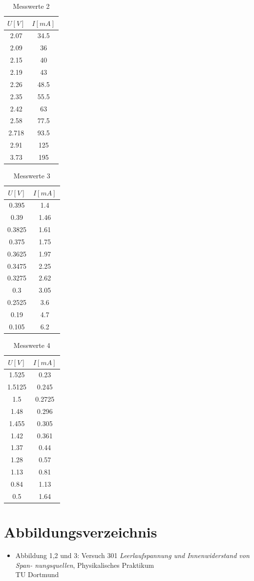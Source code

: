 \documentclass[11pt]{article}
\begin{document}
 
 \begin{table}[H]
 \centering
 \caption{Messwerte 2}
 \begin{tabular}{|c|c|}
  \hline
  $U[V]$ & $I[mA]$  \\
  \hline
  2.07 & 34.5 \\
  2.09 & 36 \\
  2.15 & 40 \\
  2.19 & 43 \\
  2.26 & 48.5\\
  2.35 & 55.5\\
  2.42 & 63 \\
  2.58 & 77.5\\
  2.718 & 93.5\\
  2.91 & 125\\
  3.73 & 195\\
  \hline
 \end{tabular}
 \label{Messung 2}
 \end{table}
 
 
 \begin{table}[H]
 \centering
 \caption{Messwerte 3}
 \begin{tabular}{|c|c|}
  \hline
  $U[V]$ & $I[mA]$  \\
  \hline
  0.395 & 1.4 \\
  0.39 & 1.46 \\
  0.3825& 1.61 \\
  0.375 & 1.75 \\
  0.3625 & 1.97\\
  0.3475 & 2.25\\
  0.3275 & 2.62 \\
  0.3 & 3.05\\
  0.2525 & 3.6\\
  0.19 & 4.7\\
  0.105 & 6.2\\
  \hline
 \end{tabular}
 \label{Messung 3}
 \end{table}
 
 
 \begin{table}[H]
 \centering
 \caption{Messwerte 4}
 \begin{tabular}{|c|c|}
  \hline
  $U[V]$ & $I[mA]$  \\
  \hline
  1.525 & 0.23 \\
  1.5125 & 0.245 \\
  1.5& 0.2725 \\
  1.48 & 0.296 \\
  1.455 & 0.305\\
  1.42& 0.361\\
  1.37 & 0.44 \\
  1.28 & 0.57\\
  1.13 & 0.81\\
  0.84 & 1.13\\
  0.5 & 1.64\\
  \hline
 \end{tabular}
 \label{Messung 4}
 \end{table}
 
 
\section{Abbildungsverzeichnis}
\begin{itemize}
\item Abbildung 1,2 und 3: Versuch 301 \textit{Leerlaufspannung und Innenwiderstand von Span-
nungsquellen}, Physikalisches Praktikum\\ TU Dortmund
\end{itemize}
\end{document}
